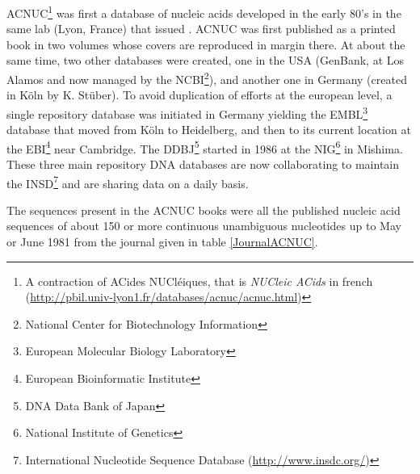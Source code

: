 \documentclass{article}
\begin{document}
ACNUC\footnote{
A contraction of ACides NUCl{\'e}iques, that is \emph{NUCleic ACids}
in french (\url{http://pbil.univ-lyon1.fr/databases/acnuc/acnuc.html})}
was first a database of nucleic acids developed in the early
80's in the same lab (Lyon, France) that issued \seqinr{}. ACNUC was first published
as a printed book in two volumes \cite{GautierC1982a, GautierC1982b}
whose covers are reproduced in margin there. At about the same time, two
other databases were created, one in the USA (GenBank,
at Los Alamos and now managed by the NCBI\footnote{National Center for Biotechnology Information}), 
and another one in Germany
(created in K{\"o}ln by K. St{\"u}ber). To avoid duplication of efforts at the
european level, a single repository database was initiated in Germany yielding
the EMBL\footnote{European Molecular Biology Laboratory} database that moved from K{\"o}ln
to Heidelberg, and then to its current location at the EBI\footnote{European Bioinformatic
Institute} near Cambridge. The DDBJ\footnote{DNA Data Bank of Japan} started
in 1986 at the NIG\footnote{National Institute of Genetics} in Mishima. These three
main repository DNA databases are now collaborating to maintain the INSD\footnote{
International Nucleotide Sequence Database (\url{http://www.insdc.org/})} 
and are sharing data on a daily basis.


The sequences present in the ACNUC books \cite{GautierC1982a, GautierC1982b} were all
the published nucleic acid sequences of about 150 or more continuous
unambiguous nucleotides up to May or June 1981 from the journal given in
table \ref{JournalACNUC}.
\end{document}

